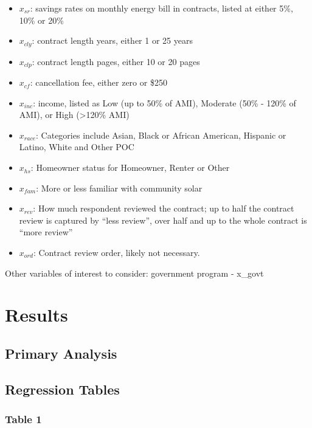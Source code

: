 \documentclass[
]{article}
\providecommand{\tightlist}{%
  \setlength{\itemsep}{0pt}\setlength{\parskip}{0pt}}
\begin{document}
\begin{itemize}
\tightlist
\item
  \(x_{sr}\): savings rates on monthly energy bill in contracts, listed
  at either 5\%, 10\% or 20\%
\item
  \(x_{cly}\): contract length years, either 1 or 25 years
\item
  \(x_{clp}\): contract length pages, either 10 or 20 pages
\item
  \(x_{cf}\): cancellation fee, either zero or \$250
\item
  \(x_{inc}\): income, listed as Low (up to 50\% of AMI), Moderate (50\%
  - 120\% of AMI), or High (\textgreater120\% AMI)
\item
  \(x_{race}\): Categories include Asian, Black or African American,
  Hispanic or Latino, White and Other POC
\item
  \(x_{hs}\): Homeowner status for Homeowner, Renter or Other
\item
  \(x_{fam}\): More or less familiar with community solar
\item
  \(x_{rev}\): How much respondent reviewed the contract; up to half the
  contract review is captured by ``less review'', over half and up to
  the whole contract is ``more review''
\item
  \(x_{ord}\): Contract review order, likely not necessary.
\end{itemize}

Other variables of interest to consider: government program - x\_govt

\hypertarget{results}{%
\section{Results}\label{results}}

\hypertarget{primary-analysis}{%
\subsection{Primary Analysis}\label{primary-analysis}}

\hypertarget{regression-tables}{%
\subsection{Regression Tables}\label{regression-tables}}

\hypertarget{table-1}{%
\subsubsection{Table 1}\label{table-1}}
\end{document}

